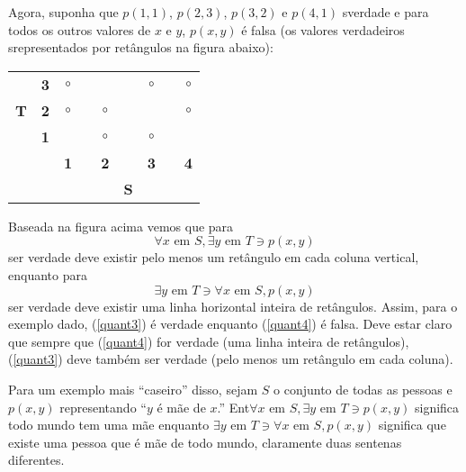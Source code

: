 Agora, suponha que $p(1,1)$, $p(2,3)$, $p(3,2)$ e $p(4,1)$ s\ao verdade e para todos os outros valores de $x$ e $y$, $p(x,y)$ \'e falsa (os valores verdadeiros s\ao representados por ret\^angulos na figura abaixo):

\begin{table}[H]
\centering
\begin{tabular}{ccccccccc}
\multicolumn{1}{c}{       } &  \multicolumn{1}{c|}{{\bf 3}} & $\circ$ & \quad& \frame{$\circ$} &\quad & $\circ$ &\quad & $\circ$ \\
\multicolumn{1}{c}{{\bf T}} &  \multicolumn{1}{c|}{{\bf 2}} & $\circ$ & \quad& $\circ$ &\quad & \frame{$\circ$} &\quad & $\circ$ \\
\multicolumn{1}{c}{       } &  \multicolumn{1}{c|}{{\bf 1}} & \frame{$\circ$} & \quad& $\circ$ &\quad & $\circ$ &\quad & \frame{$\circ$} \\\cline{3-9}
                            &                               & {\bf 1} & \quad& {\bf 2} &\quad & {\bf 3} &\quad & {\bf 4} \\
                            &                               &         & \quad&         &{\bf S}&        &\quad &   \\
\end{tabular}
\end{table}
Baseada na figura acima vemos que para
\begin{equation}\label{quant3}
\forall x \textrm{ em } S, \exists y \textrm{ em } T \ni  p(x,y)
\end{equation}
ser verdade deve existir pelo menos um ret\^angulo em cada coluna vertical, enquanto para
\begin{equation}\label{quant4}
\exists y \textrm{ em } T \ni \forall x \textrm{ em } S, p(x,y)
\end{equation}
ser verdade deve existir uma linha horizontal inteira de ret\^angulos. Assim, para o exemplo dado, (\ref{quant3}) \'e verdade enquanto (\ref{quant4}) \'e falsa. Deve estar claro que sempre que (\ref{quant4}) for verdade (uma linha inteira de ret\^angulos), (\ref{quant3}) deve tamb\'em ser verdade (pelo menos um ret\^angulo em cada coluna).

Para um exemplo mais ``caseiro'' disso, sejam $S$ o conjunto de todas as pessoas e $p(x,y)$ representando ``$y$ \'e m\~ae de $x$.'' Ent\ao $\forall x \textrm{ em } S, \exists y \textrm{ em } T \ni  p(x,y)$ significa todo mundo tem uma m\~ae enquanto $\exists y \textrm{ em } T \ni \forall x \textrm{ em } S, p(x,y)$ significa que existe uma pessoa que \'e m\~ae de todo mundo, claramente duas senten\cc as diferentes.

